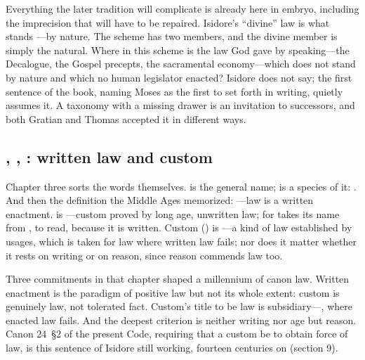 Everything the later tradition will complicate is already here in embryo, including the imprecision that will have to be repaired. Isidore's ``divine'' law is what stands ---by nature. The scheme has two members, and the divine member is simply the natural. Where in this scheme is the law God gave by speaking---the Decalogue, the Gospel precepts, the sacramental economy---which does not stand by nature and which no human legislator enacted? Isidore does not say; the first sentence of the book, naming Moses as the first to set forth  in writing, quietly assumes it. A taxonomy with a missing drawer is an invitation to successors, and both Gratian and Thomas accepted it in different ways.

\subsection{, , : written law and custom}

Chapter three sorts the words themselves.  is the general name;  is a species of it: . And then the definition the Middle Ages memorized: ---law is a written enactment.  is ---custom proved by long age, unwritten law; for  takes its name from , to read, because it is written. Custom () is ---a kind of law established by usages, which is taken for law where written law fails; nor does it matter whether it rests on writing or on reason, since reason commends law too.

Three commitments in that chapter shaped a millennium of canon law. Written enactment is the paradigm of positive law but not its whole extent: custom is genuinely law, not tolerated fact. Custom's title to be law is subsidiary---, where enacted law fails. And the deepest criterion is neither writing nor age but reason. Canon 24~§2 of the present Code, requiring that a custom be  to obtain force of law, is this sentence of Isidore still working, fourteen centuries on (section 9).

